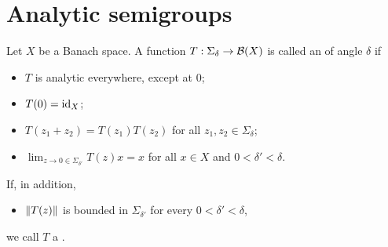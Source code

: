 \section{Analytic semigroups}
\begin{definition}
Let $X$ be a Banach space. A function $T: \Sigma_\delta \to \operatorname{\mathcal{B}}(X)$ is called an  of angle $\delta$ if
\begin{itemize}
\item $T$ is analytic everywhere, except at $0$;
\item $T(0) = \operatorname{id}_X$;
\item $T(z_1 + z_2) = T(z_1)T(z_2)$ for all $z_1,z_2\in \Sigma_\delta$;
\item $\lim_{z\to 0 \in \Sigma_{\delta'}}T(z)x = x$ for all $x\in X$ and $0<\delta'<\delta$.
\end{itemize}
If, in addition,
\begin{itemize}
\item $\lVert T(z)\rVert$ is bounded in $\Sigma_{\delta'}$ for every $0<\delta'<\delta$,
\end{itemize}
we call $T$ a .
\end{definition}

